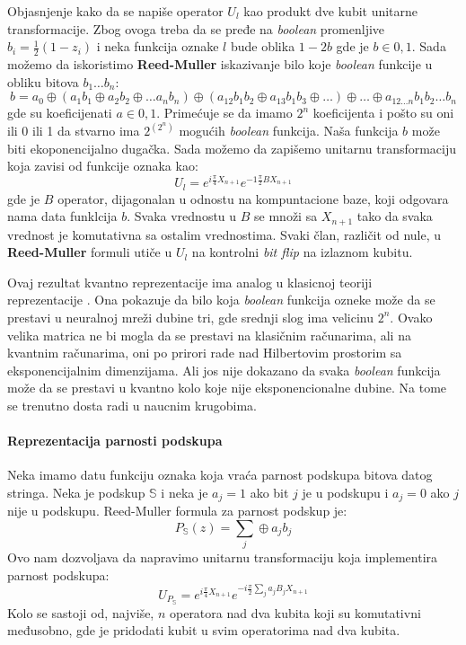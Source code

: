 \documentclass[12pt, letterpaper, oneside]{article}
\begin{document}
Objasnjenje kako da se napiše operator $U_l$ kao produkt dve kubit unitarne transformacije. Zbog ovoga treba da se pređe na \textit{boolean} promenljive $b_i=\frac{1}{2}(1-z_i)$ i 
neka funkcija oznake $l$ bude oblika $1-2b$ gde je $b \in {0,1}$. Sada možemo da iskoristimo \textbf{Reed-Muller} iskazivanje bilo koje \textit{boolean} funkcije u obliku bitova $b_1 \dots b_n$:
\[
    b = a_0 \oplus (a_1b_1 \oplus a_2b_2 \oplus \dots a_nb_n) \oplus (a_{12}b_1b_2 \oplus a_{13}b_1b_3 \oplus \dots) \oplus \dots \oplus a_{12 \dots n}b_1b_2 \dots b_n
\]
gde su koeficijenati $a \in {0,1}$. Primećuje se da imamo $2^n$ koeficijenta i pošto su oni ili 0 ili 1 da stvarno ima $2^{(2^n)}$ mogućih \textit{boolean} funkcija.
Naša funkcija $b$ može biti ekoponencijalno dugačka. Sada možemo da zapišemo unitarnu transformaciju koja zavisi od funkcije oznaka kao:
\[
    U_l = e^{i\frac{\pi}{4}X_{n+1}}e^{-1\frac{\pi}{2}BX_{n+1}}
\]
gde je $B$ operator, dijagonalan u odnostu na kompuntacione baze, koji odgovara nama data funklcija $b$. 
Svaka vrednostu u $B$ se množi sa $X_{n+1}$ tako da svaka vrednost je komutativna sa ostalim vrednostima. 
Svaki član, različit od nule, u \textbf{Reed-Muller} formuli utiče u $U_l$ na kontrolni \textit{bit flip} na izlaznom kubitu.

Ovaj rezultat kvantno reprezentacije ima analog u klasicnoj teoriji \\
reprezentacije \cite{Cybenko1989ApproximationBS}.
Ona pokazuje da bilo koja \textit{boolean} funkcija ozneke može da se prestavi u neuralnoj mreži dubine tri, gde srednji slog 
ima velicinu $2^n$. Ovako velika matrica ne bi mogla da se prestavi na klasičnim računarima, ali na kvantnim računarima, oni po prirori rade
nad Hilbertovim prostorim sa eksponencijalnim dimenzijama. Ali jos nije dokazano da svaka \textit{boolean} funkcija može da se prestavi u
kvantno kolo koje nije eksponencionalne dubine. Na tome se trenutno dosta radi u naucnim krugobima.

\paragraph*{Reprezentacija parnosti podskupa}
Neka imamo datu funkciju oznaka koja vraća parnost podskupa bitova datog stringa. Neka je podskup $\mathbb{S}$
i neka je $a_j=1$ ako bit $j$ je u podskupu i $a_j=0$ ako $j$ nije u podskupu. Reed-Muller formula za parnost podskup je:
\[
    P_{\mathbb{S}}(z) = \sum_j \oplus a_jb_j
\]
Ovo nam dozvoljava da napravimo unitarnu transformaciju koja implementira parnost podskupa:
\[
    U_{P_{\mathbb{S}}} = e^{i\frac{\pi}{4}X_{n+1}}e^{-i\frac{\pi}{2}\sum_j a_jB_jX_{n+1}}
\]
Kolo se sastoji od, najviše, $n$ operatora nad dva kubita koji su komutativni međusobno, gde je pridodati kubit u svim operatorima nad dva kubita.
\end{document}
